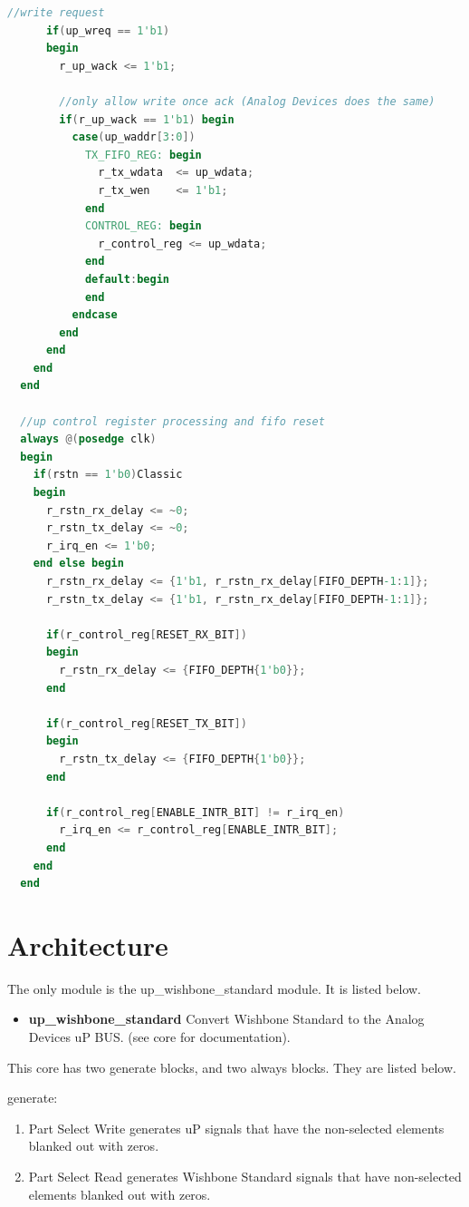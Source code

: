\begin{lstlisting}[language=Verilog]
      //write request
      if(up_wreq == 1'b1)
      begin
        r_up_wack <= 1'b1;

        //only allow write once ack (Analog Devices does the same)
        if(r_up_wack == 1'b1) begin
          case(up_waddr[3:0])
            TX_FIFO_REG: begin
              r_tx_wdata  <= up_wdata;
              r_tx_wen    <= 1'b1;
            end
            CONTROL_REG: begin
              r_control_reg <= up_wdata;
            end
            default:begin
            end
          endcase
        end
      end
    end
  end

  //up control register processing and fifo reset
  always @(posedge clk)
  begin
    if(rstn == 1'b0)Classic
    begin
      r_rstn_rx_delay <= ~0;
      r_rstn_tx_delay <= ~0;
      r_irq_en <= 1'b0;
    end else begin
      r_rstn_rx_delay <= {1'b1, r_rstn_rx_delay[FIFO_DEPTH-1:1]};
      r_rstn_tx_delay <= {1'b1, r_rstn_rx_delay[FIFO_DEPTH-1:1]};

      if(r_control_reg[RESET_RX_BIT])
      begin
        r_rstn_rx_delay <= {FIFO_DEPTH{1'b0}};
      end

      if(r_control_reg[RESET_TX_BIT])
      begin
        r_rstn_tx_delay <= {FIFO_DEPTH{1'b0}};
      end

      if(r_control_reg[ENABLE_INTR_BIT] != r_irq_en)
        r_irq_en <= r_control_reg[ENABLE_INTR_BIT];
      end
    end
  end
\end{lstlisting}

\section{Architecture}
\par
The only module is the up\_wishbone\_standard module. It is listed below.

\begin{itemize}
  \item \textbf{up\_wishbone\_standard} Convert Wishbone Standard to the Analog Devices uP BUS. (see core for documentation).
\end{itemize}

\par
This core has two generate blocks, and two always blocks. They are listed below.

generate:
\begin{enumerate}
\item Part Select Write generates uP signals that have the non-selected elements blanked out with zeros.
\item Part Select Read generates Wishbone Standard signals that have non-selected elements blanked out with zeros.
\end{enumerate}

